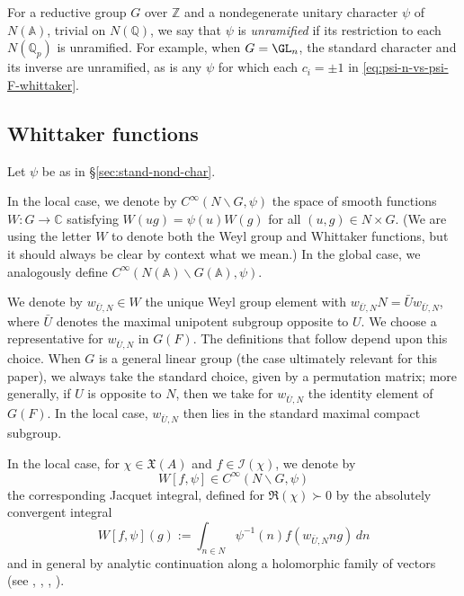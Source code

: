 For a reductive group $G$ over $\mathbb{Z}$ and a nondegenerate unitary character $\psi$ of $N(\mathbb{A})$, trivial on $N(\mathbb{Q})$, we say that $\psi$ is \emph{unramified} if its restriction to each $N(\mathbb{Q}_p)$ is unramified.  For example, when $G = \GL_n$, the standard character and its inverse are unramified, as is any $\psi$ for which each $c_i = \pm 1$ in \eqref{eq:psi-n-vs-psi-F-whittaker}.

\subsection{Whittaker functions}\label{sec:whittaker-functions-1}
Let $\psi$ be as in \S\ref{sec:stand-nond-char}.

In the local case, we denote by $C^\infty(N \backslash G, \psi)$ the space of smooth functions $W : G \rightarrow \mathbb{C}$ satisfying $W(u g) = \psi(u) W(g)$ for all $(u,g) \in N \times G$.  (We are using the letter $W$ to denote both the Weyl group and Whittaker functions, but it should always be clear by context what we mean.)  In the global case, we analogously define $C^\infty(N(\mathbb{A}) \backslash G(\mathbb{A}), \psi)$.

We denote by $w_{\bar{U},N} \in W$ the unique Weyl group element with $w_{\bar{U},N} N = \bar{U} w_{\bar{U},N}$, where $\bar{U}$ denotes the maximal unipotent subgroup opposite to $U$.  We choose a representative for $w_{\overline{U}, N}$ in $G(F)$.  The definitions that follow depend upon this choice.  When $G$ is a general linear group (the case ultimately relevant for this paper), we always take the standard choice, given by a permutation matrix; more generally, if $U$ is opposite to $N$, then we take for $w_{\overline{U}, N}$ the identity element of $G(F)$.  In the local case, $w_{\overline{U},N}$ then lies in the standard maximal compact subgroup.

In the local case, for $\chi \in \mathfrak{X}(A)$ and $f \in \mathcal{I}(\chi)$, we denote by
\begin{equation*}
  W[f,\psi] \in C^\infty(N \backslash G, \psi)
\end{equation*}
the corresponding Jacquet integral, defined for $\Re(\chi) \succ 0$ by the absolutely convergent integral 
\begin{equation*}
  W[f, \psi](g) := \int_{n \in N} \psi^{-1}(n)
  f(w_{\bar{U},N} n g) \, d n
\end{equation*}
and in general by analytic continuation along a holomorphic family of vectors (see \cite[\S3]{MR716292}, \cite[\S7.2]{MR2533003}, \cite[\S15]{MR1170566}, \cite{MR563369}).

